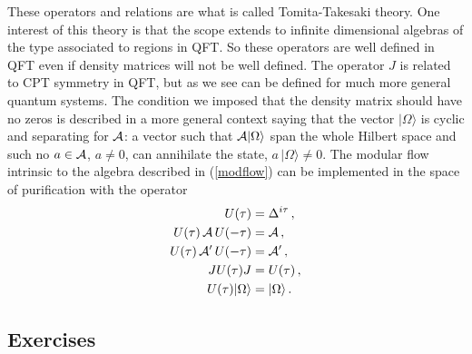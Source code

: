 \documentclass[12pt]{article}
\numberwithin{equation}{section}
\begin{document}
These operators and relations are what is called Tomita-Takesaki theory. One interest of this theory is that the scope extends to infinite dimensional algebras of the type associated to regions in QFT. So these operators are well defined in QFT even if density matrices will not be well defined. The operator $J$ is related to CPT symmetry in QFT, but as we see can be defined for much more general quantum systems. The condition we imposed that the density matrix should have no zeros is described in a more general context saying that the vector $|\Omega\rangle$ is 
 cyclic and separating for ${\cal A}$: a vector such that ${\cal A} \vert \Omega \rangle$ span the whole Hilbert space and such no $a\in {\cal A}$, $a\neq 0$,  can annihilate the state, $a\,|\Omega \rangle \neq 0$. The modular flow intrinsic to the algebra described in (\ref{modflow}) can be implemented in the space of purification with the operator  
\begin{align}
 U(\tau)&=\Delta^{i \tau}\,, \nonumber\\
 U(\tau)\,{\cal A}\, U(-\tau)&= {\cal A}\,,\nonumber\\
 U(\tau)\,{\cal A}'\, U(-\tau)&= {\cal A}'\,,\nonumber\\
 J U(\tau) J&=U(\tau)\,,\nonumber\\
  U(\tau)|\Omega \rangle &=|\Omega \rangle\,.
\end{align}

\subsection{Exercises}
\end{document}
